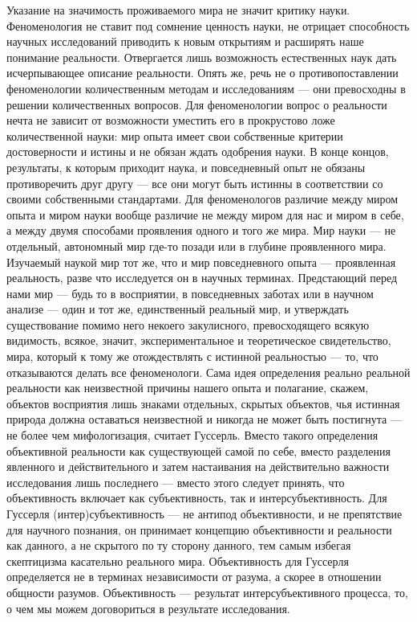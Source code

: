 \documentclass[11pt]{book}
\begin{document}
Указание на значимость проживаемого мира не значит критику науки. Феноменология не ставит под сомнение ценность науки, не отрицает способность научных исследований приводить к новым открытиям и расширять наше понимание реальности. Отвергается лишь возможность естественных наук дать исчерпывающее описание реальности. Опять же, речь не о противопоставлении феноменологии количественным методам и исследованиям --- они превосходны в решении количественных вопросов. Для феноменологии вопрос о реальности нечта не зависит от возможности уместить его в прокрустово ложе количественной науки: мир опыта имеет свои собственные критерии достоверности и истины и не обязан ждать одобрения науки. В конце концов, результаты, к которым приходит наука, и повседневный опыт не обязаны противоречить друг другу --- все они могут быть истинны в соответствии со своими собственными стандартами. Для феноменологов различие между миром опыта и миром науки вообще различие не между миром для нас и миром в себе, а между двумя способами проявления одного и того же мира. Мир науки --- не отдельный, автономный мир где-то позади или в глубине проявленного мира. Изучаемый наукой мир тот же, что и мир повседневного опыта --- проявленная реальность, разве что исследуется он в научных терминах. Предстающий перед нами мир --- будь то в восприятии, в повседневных заботах или в научном анализе --- один и тот же, единственный реальный мир, и утверждать существование помимо него некоего закулисного, превосходящего всякую видимость, всякое, значит, экспериментальное и теоретическое свидетельство, мира, который к тому же отождествлять с истинной реальностью --- то, что отказываются делать все феноменологи. Сама идея определения реально реальной реальности как неизвестной причины нашего опыта и полагание, скажем, объектов восприятия лишь знаками отдельных, скрытых объектов, чья истинная природа должна оставаться неизвестной и никогда не может быть постигнута --- не более чем мифологизация, считает Гуссерль. Вместо такого определения объективной реальности как существующей самой по себе, вместо разделения явленного и действительного и затем настаивания на действительно важности исследования лишь последнего --- вместо этого следует принять, что объективность включает как субъективность, так и интерсубъективность. Для Гуссерля (интер)субъективность --- не антипод объективности, и не препятствие для научного познания, он принимает концепцию объективности и реальности как данного, а не скрытого по ту сторону данного, тем самым избегая скептицизма касательно реального мира. Объективность для Гуссерля определяется не в терминах независимости от разума, а скорее в отношении общности разумов. Объективность --- результат интерсубъективного процесса, то, о чем мы можем договориться в результате исследования.
\end{document}
